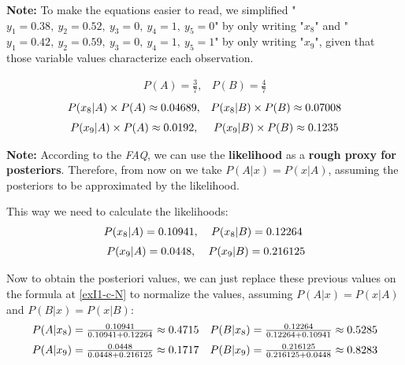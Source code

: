\documentclass[12pt]{article}
\begin{document}
\begin{enumerate}[leftmargin=\labelsep]
\begin{enumerate}
          \textbf{Note:} To make the equations easier to read, we simplified "$y_1 = 0.38, \ y_2 = 0.52, \ y_3 = 0, \ y_4 = 1, \ y_5 = 0$" by only writing "$x_8$"
          and "$y_1 = 0.42, \ y_2 = 0.59, \ y_3 = 0, \ y_4 = 1, \ y_5 = 1$" by only writing "$x_9$", given that those variable values characterize each observation.

          \[
              \begin{array}{cc}
                  P(A) = \frac{3}{7}, &
                  P(B) = \frac{4}{7}
              \end{array}
          \]
          \[
              \begin{array}{cc}
                  P(x_8 | A) \times P(A) \approx 0.04689, &
                  P(x_8 | B) \times P(B) \approx 0.07008  \\[\medskipamount]
                  P(x_9 | A) \times P(A) \approx 0.0192,  &
                  P(x_9 | B) \times P(B) \approx 0.1235
              \end{array}
          \]

          \textbf{Note:} According to the \textit{FAQ}, we can use the \textbf{likelihood} as a \textbf{rough proxy for posteriors}.
          Therefore, from now on we take $P(A | x) = P(x | A)$, assuming the posteriors to be approximated by the likelihood.

          This way we need to calculate the likelihoods:
          $$
              \begin{array}{cc}
                  P(x_8 | A) = 0.10941, &
                  P(x_8 | B) = 0.12264  \\[\medskipamount]
                  P(x_9 | A) = 0.0448,  &
                  P(x_9 | B) = 0.216125
              \end{array}
          $$

          Now to obtain the posteriori values, we can just replace these previous values on the formula at \eqref{exI1-c-N} to normalize the values,
          assuming $P(A | x) = P(x | A)$ and $P(B | x) = P(x | B)$:
          $$
              \begin{array}{cc}
                  P(A | x_8) = \frac{0.10941}{0.10941 + 0.12264} \approx 0.4715 &
                  P(B | x_8) = \frac{0.12264}{0.12264 + 0.10941} \approx 0.5285 \\[\medskipamount]
                  P(A | x_9) = \frac{0.0448}{0.0448 + 0.216125} \approx 0.1717  &
                  P(B | x_9) = \frac{0.216125}{0.216125 + 0.0448} \approx 0.8283
              \end{array}
          $$


\end{enumerate}
\end{enumerate}
\end{document}
